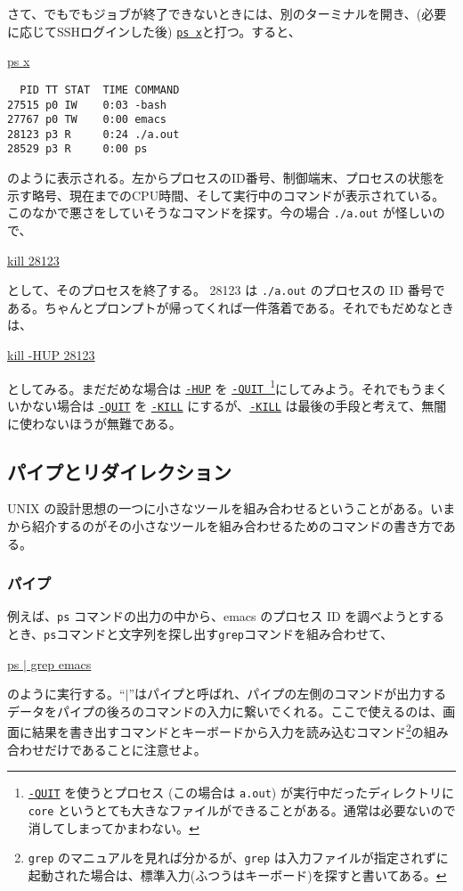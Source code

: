 さて、でもでもジョブが終了できないときには、別のターミナルを開き、(必要に応じてSSHログインした後) \underline{\texttt{ps x}}と打つ。すると、
\begin{commandline2}
    \prompt \underline{ps x}
    \begin{verbatim}
  PID TT STAT  TIME COMMAND
27515 p0 IW    0:03 -bash
27767 p0 TW    0:00 emacs
28123 p3 R     0:24 ./a.out
28529 p3 R     0:00 ps
\end{verbatim}
\end{commandline2} \noindent
のように表示される。左からプロセスのID番号、制御端末、プロセスの状態を示す略号、現在までのCPU時間、そして実行中のコマンドが表示されている。このなかで悪さをしていそうなコマンドを探す。今の場合 \texttt{./a.out} が怪しいので、
\begin{commandline2}
    \prompt \underline{kill 28123}
\end{commandline2} \noindent
として、そのプロセスを終了する。 28123 は \texttt{./a.out} のプロセスの ID 番号である。ちゃんとプロンプトが帰ってくれば一件落着である。それでもだめなときは、
\begin{commandline2}
    \prompt \underline{kill -HUP 28123}
\end{commandline2} \noindent
としてみる。まだだめな場合は \underline{\texttt{-HUP}} を \underline{\texttt{-QUIT }}\footnote{\underline{\texttt{-QUIT}} を使うとプロセス (この場合は \texttt{a.out}) が実行中だったディレクトリに\texttt{core} というとても大きなファイルができることがある。通常は必要ないので消してしまってかまわない。}にしてみよう。それでもうまくいかない場合は \underline{\texttt{-QUIT}} を \underline{\texttt{-KILL}} にするが、\underline{\texttt{-KILL}} は最後の手段と考えて、無闇に使わないほうが無難である。

\subsection{パイプとリダイレクション}

UNIX の設計思想の一つに小さなツールを組み合わせるということがある。いまから紹介するのがその小さなツールを組み合わせるためのコマンドの書き方である。

\subsubsection*{パイプ}
例えば、\texttt{ps} コマンドの出力の中から、emacs のプロセス ID を調べようとするとき、\texttt{ps}コマンドと文字列を探し出す\texttt{grep}コマンドを組み合わせて、
\begin{commandline2}
    \prompt \underline{ps \(|\) grep emacs}
\end{commandline2} \noindent
のように実行する。``\texttt{\(|\)}''はパイプと呼ばれ、パイプの左側のコマンドが出力するデータをパイプの後ろのコマンドの入力に繋いでくれる。ここで使えるのは、画面に結果を書き出すコマンドとキーボードから入力を読み込むコマンド\footnote{\texttt{grep} のマニュアルを見れば分かるが、\texttt{grep} は入力ファイルが指定されずに起動された場合は、標準入力(ふつうはキーボード)を探すと書いてある。}の組み合わせだけであることに注意せよ。

